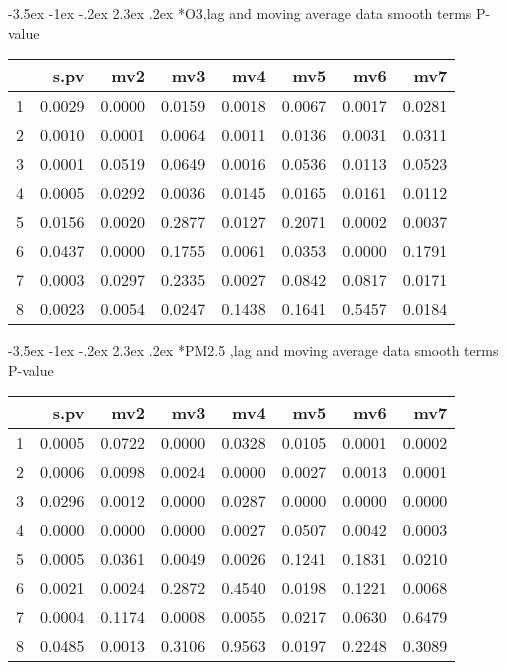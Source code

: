 \documentclass[a4paper, 12pt]{article}
\makeatletter
\def\Large{\fontsize{16}{24}\selectfont}
\renewcommand\section{\@startsection {section}{1}{\z@}%
                                   {-3.5ex \@plus -1ex \@minus -.2ex}%
                                   {2.3ex \@plus.2ex}%
                                   {\centering\normalfont\Large\bfseries}}
\makeatother
\begin{document}
\section*{O3,lag and moving average data}
smooth terms P-value
\begin{table}[ht]
\centering
\begin{tabular}{rrrrrrrr}
  \hline
 & s.pv & mv2 & mv3 & mv4 & mv5 & mv6 & mv7 \\
  \hline
1 & 0.0029 & 0.0000 & 0.0159 & 0.0018 & 0.0067 & 0.0017 & 0.0281 \\
  2 & 0.0010 & 0.0001 & 0.0064 & 0.0011 & 0.0136 & 0.0031 & 0.0311 \\
  3 & 0.0001 & 0.0519 & 0.0649 & 0.0016 & 0.0536 & 0.0113 & 0.0523 \\
  4 & 0.0005 & 0.0292 & 0.0036 & 0.0145 & 0.0165 & 0.0161 & 0.0112 \\
  5 & 0.0156 & 0.0020 & 0.2877 & 0.0127 & 0.2071 & 0.0002 & 0.0037 \\
  6 & 0.0437 & 0.0000 & 0.1755 & 0.0061 & 0.0353 & 0.0000 & 0.1791 \\
  7 & 0.0003 & 0.0297 & 0.2335 & 0.0027 & 0.0842 & 0.0817 & 0.0171 \\
  8 & 0.0023 & 0.0054 & 0.0247 & 0.1438 & 0.1641 & 0.5457 & 0.0184 \\
   \hline
\end{tabular}
\end{table}
\clearpage
\section*{PM2.5 ,lag and moving average data}
smooth terms P-value
\begin{table}[ht]
\centering
\begin{tabular}{rrrrrrrr}
  \hline
 & s.pv & mv2 & mv3 & mv4 & mv5 & mv6 & mv7 \\
  \hline
1 & 0.0005 & 0.0722 & 0.0000 & 0.0328 & 0.0105 & 0.0001 & 0.0002 \\
  2 & 0.0006 & 0.0098 & 0.0024 & 0.0000 & 0.0027 & 0.0013 & 0.0001 \\
  3 & 0.0296 & 0.0012 & 0.0000 & 0.0287 & 0.0000 & 0.0000 & 0.0000 \\
  4 & 0.0000 & 0.0000 & 0.0000 & 0.0027 & 0.0507 & 0.0042 & 0.0003 \\
  5 & 0.0005 & 0.0361 & 0.0049 & 0.0026 & 0.1241 & 0.1831 & 0.0210 \\
  6 & 0.0021 & 0.0024 & 0.2872 & 0.4540 & 0.0198 & 0.1221 & 0.0068 \\
  7 & 0.0004 & 0.1174 & 0.0008 & 0.0055 & 0.0217 & 0.0630 & 0.6479 \\
  8 & 0.0485 & 0.0013 & 0.3106 & 0.9563 & 0.0197 & 0.2248 & 0.3089 \\
   \hline
\end{tabular}
\end{table}
\clearpage
\end{document}
